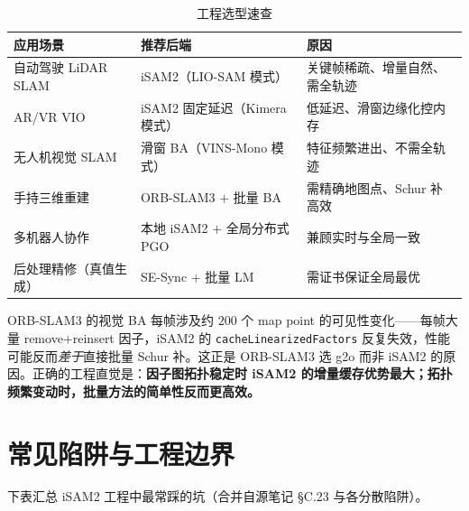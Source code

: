 \begin{table}[H]\centering\small
\caption{工程选型速查}
\label{tab:selection}
\begin{tabular}{lll}
\toprule
应用场景 & 推荐后端 & 原因 \\
\midrule
自动驾驶 LiDAR SLAM & iSAM2（LIO-SAM 模式） & 关键帧稀疏、增量自然、需全轨迹 \\
AR/VR VIO & iSAM2 固定延迟（Kimera 模式） & 低延迟、滑窗边缘化控内存 \\
无人机视觉 SLAM & 滑窗 BA（VINS-Mono 模式） & 特征频繁进出、不需全轨迹 \\
手持三维重建 & ORB-SLAM3 $+$ 批量 BA & 需精确地图点、Schur 补高效 \\
多机器人协作 & 本地 iSAM2 $+$ 全局分布式 PGO & 兼顾实时与全局一致 \\
后处理精修（真值生成） & SE-Sync $+$ 批量 LM & 需证书保证全局最优 \\
\bottomrule
\end{tabular}
\end{table}

\begin{insight}
ORB-SLAM3 的视觉 BA 每帧涉及约 $200$ 个 map point 的可见性变化——每帧大量 remove$+$reinsert 因子，iSAM2 的 \texttt{cacheLinearizedFactors} 反复失效，性能可能反而\emph{差于}直接批量 Schur 补。这正是 ORB-SLAM3 选 g2o 而非 iSAM2 的原因。正确的工程直觉是：\textbf{因子图拓扑稳定时 iSAM2 的增量缓存优势最大；拓扑频繁变动时，批量方法的简单性反而更高效。}
\end{insight}

\section{常见陷阱与工程边界}
\label{sec:isam-pitfalls}

下表汇总 iSAM2 工程中最常踩的坑（合并自源笔记 §C.23 与各分散陷阱）。

